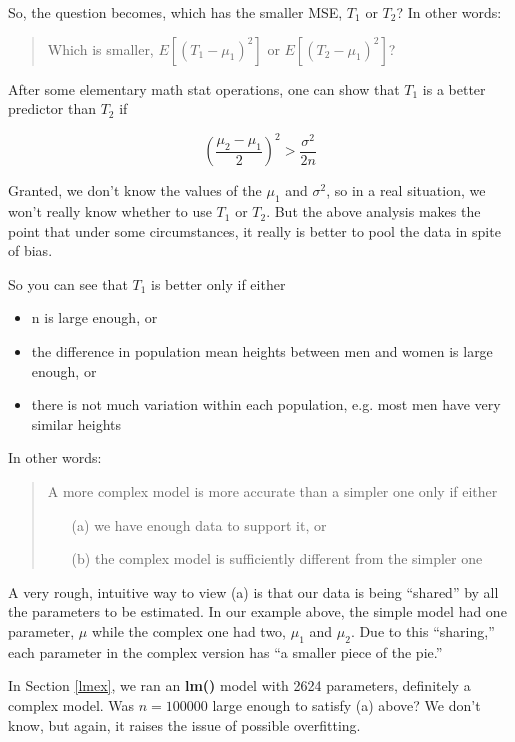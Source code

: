 So, the question becomes, which has the smaller MSE, $T_1$ or
$T_2$?  In other words:

\begin{quote}
Which is smaller, $E[(T_1 - \mu_1)^2]$ or $E[(T_2 - \mu_1)^2]$?
\end{quote}

After some elementary math stat operations, one can show that
$T_1$ is a better predictor than $T_2$ if 

\begin{equation}
\label{betteriff}
\left ( \frac{\mu_2-\mu_1}{2} \right)^2 >
\frac{\sigma^2}{2n}
\end{equation}

Granted, we don't know the values of the $\mu_1$ and $\sigma^2$, so in a
real situation, we won't really know whether to use $T_1$ or $T_2$.  But
the above analysis makes the point that under some circumstances, it
really is better to pool the data in spite of bias.

So you can see that $T_1$ is better only if either

\begin{itemize}

\item n is large enough, or

\item the difference in population mean heights between men and women is
large enough, or

\item there is not much variation within each population, e.g. most men
have very similar heights

\end{itemize}

In other words:

\begin{quote}
A more complex model is more accurate than a simpler one only if either 

\begin{itemize}

\item [(a)] we have enough data to support it, or

\item [(b)] the complex model is sufficiently different from the simpler one

\end{itemize}

\end{quote}

A very rough, intuitive way to view (a) is that our data is being
``shared'' by all the parameters to be estimated.  In our example above,
the simple model had one parameter, $\mu$ while the complex one had two,
$\mu_1$ and $\mu_2$.  Due to this ``sharing,'' each parameter in the
complex version has ``a smaller piece of the pie.''

In Section \ref{lmex}, we ran an \textbf{lm()} model with 2624
parameters, definitely a complex model.  Was $n = 100000$ large enough
to satisfy (a) above?  We don't know, but again, it raises the issue of
possible overfitting.



